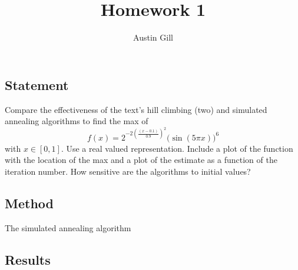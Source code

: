 \documentclass{article}
\title{Homework 1}
\author{Austin Gill}
\begin{document}
\maketitle


\section{}\label{prob:1}

\subsection{Statement}
Compare the effectiveness of the text's hill climbing (two) and simulated annealing algorithms to
find the max of
\[ f(x) = 2^{-2{\left(\frac{(x - 0.1)}{0.9}\right)}^2}{\big(\sin(5\pi x)\big)}^6\]
with $x\in [0,1]$. Use a real valued representation. Include a plot of the function with the
location of the max and a plot of the estimate as a function of the iteration number. How sensitive
are the algorithms to initial values?
\subsection{Method}

\begin{algorithm}[H]
    \begin{algorithmic}
        \EndIf{}
        \EndWhile{}
    \end{algorithmic}
    \caption{The simulated annealing algorithm}\label{alg:simulated-annealing}
\end{algorithm}


\subsection{Results}
\end{document}
